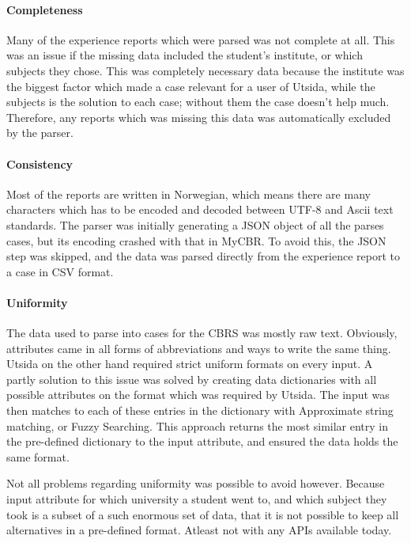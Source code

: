\paragraph{Completeness}
Many of the experience reports which were parsed was not complete at all. This was an issue if the missing data included the student's institute, or which subjects they chose. This was completely necessary data because the institute was the biggest factor which made a case relevant for a user of Utsida, while the subjects is the solution to each case; without them the case doesn't help much. Therefore, any reports which was missing this data was automatically excluded by the parser.

\paragraph{Consistency}
Most of the reports are written in Norwegian, which means there are many characters which has to be encoded and decoded between UTF-8 and Ascii text standards. The parser was initially generating a JSON object of all the parses cases, but its encoding crashed with that in MyCBR. To avoid this, the JSON step was skipped, and the data was parsed directly from the experience report to a case in CSV format.

\paragraph{Uniformity}
The data used to parse into cases for the CBRS was mostly raw text. Obviously, attributes came in all forms of abbreviations and ways to write the same thing. Utsida on the other hand required strict uniform formats on every input. A partly solution to this issue was solved by creating data dictionaries with all possible attributes on the format which was required by Utsida. The input was then matches to each of these entries in the dictionary with Approximate string matching, or Fuzzy Searching. This approach returns the most similar entry in the pre-defined dictionary to the input attribute, and ensured the data holds the same format. 

Not all problems regarding uniformity was possible to avoid however. Because input attribute for which university a student went to, and which subject they took is a subset of a such enormous set of data, that it is not possible to keep all alternatives in a pre-defined format. Atleast not with any APIs available today.


